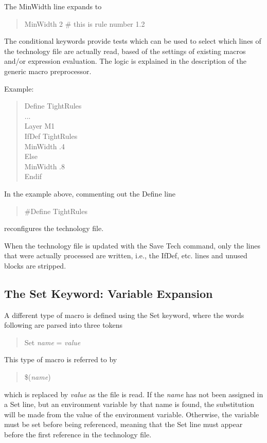 The {\vt MinWidth} line expands to
\begin{quote}\vt
MinWidth 2 \# this is rule number 1.2
\end{quote}

The conditional keywords provide tests which can be used to select
which lines of the technology file are actually read, based of the
settings of existing macros and/or expression evaluation.  The logic
is explained in the description of the generic macro preprocessor.

Example:

\begin{quote}\rr\vt
Define TightRules\\
...\\
Layer M1\\
IfDef TightRules\\
MinWidth .4\\
Else\\
MinWidth .8\\
Endif\\
\end{quote}

In the example above, commenting out the {\vt Define} line
\begin{quote}\vt
\#Define TightRules
\end{quote}
reconfigures the technology file.

When the technology file is updated with the {\cb Save Tech} command,
only the lines that were actually processed are written, i.e., the
{\vt IfDef}, etc.  lines and unused blocks are stripped.

\subsection{The {\vt Set} Keyword: Variable Expansion}

A different type of macro is defined using the {\vt Set} keyword,
where the words following are parsed into three tokens
\begin{quote}
{\vt Set} {\it name\/} {\vt =} {\it value\/}
\end{quote}

This type of macro is referred to by
\begin{quote}
{\vt \$({\it name\/})}
\end{quote}

which is replaced by {\it value\/} as the file is read.  If the {\it
name} has not been assigned in a {\vt Set} line, but an environment
variable by that name is found, the substitution will be made from the
value of the environment variable.  Otherwise, the variable must be
set before being referenced, meaning that the {\vt Set} line must
appear before the first reference in the technology file.

